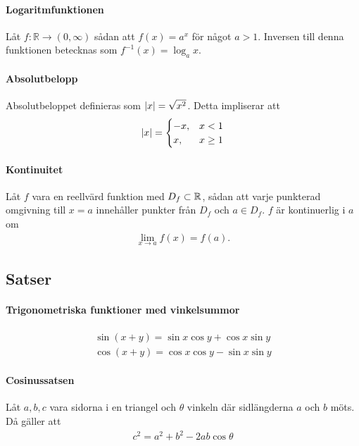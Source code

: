 \paragraph{Logaritmfunktionen}

Låt $f:\mathbb{R}\to (0,\infty)$ sådan att $f(x) = a^x$ för något $a > 1$. Inversen till denna funktionen betecknas som $f^{-1}(x) = \log_a x$.

\paragraph{Absolutbelopp}

Absolutbeloppet definieras som $\abs{x} = \sqrt{x^2}$. Detta impliserar att
\begin{align*}
	\abs{x} =
	\begin{cases}
		-x, & x < 1\\
		x,  & x \geq 1
	\end{cases}
\end{align*}
 
\paragraph{Kontinuitet}
Låt $f$ vara en reellvärd funktion med $D_f\subset\mathbb{R}$, sådan att varje punkterad omgivning till $x = a$ innehåller punkter från $D_f$ och $a\in D_f$. $f$ är kontinuerlig i $a$ om
\begin{align*}
	\lim\limits_{x\to a}f(x) = f(a).
\end{align*}

\subsection{Satser}

\paragraph{Trigonometriska funktioner med vinkelsummor}
\begin{align*}
	\sin\left(x+y\right) = \sin x\cos y + \cos x\sin y\\
	\cos\left(x+y\right) = \cos x\cos y - \sin x\sin y
\end{align*}

\paragraph{Cosinussatsen}

Låt $a,b,c$ vara sidorna i en triangel och $\theta$ vinkeln där sidlängderna $a$ och $b$ möts. Då gäller att
\begin{align*}
	c^2=a^2+b^2-2ab\cos\theta
\end{align*}

